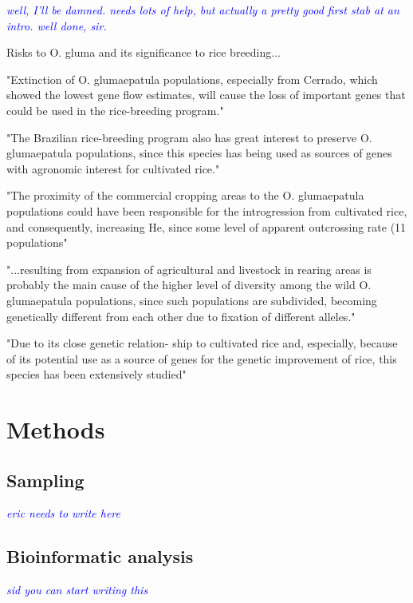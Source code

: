 \documentclass[11pt]{article} %
\newcommand{\jri}[1]{\textcolor{blue}{ \emph{\scriptsize  #1}} } %
\begin{document}
\begin{linenumbers}
\jri{well, I'll be damned. needs lots of help, but actually a pretty good first stab at an intro. well done, sir.}


Risks to O. gluma and its significance to rice breeding...

"Extinction of O. glumaepatula populations, especially from Cerrado,
which showed the lowest gene flow estimates, will cause the loss of 
important genes that could be used in the rice-breeding program."
\cite{brondani2005}

"The Brazilian rice-breeding
program also has great interest to preserve
O. glumaepatula populations, since this species has
being used as sources of genes with agronomic
interest for cultivated rice."
\cite{brondani2005}

"The proximity of the
commercial cropping areas to the O. glumaepatula
populations could have been responsible for the
introgression from cultivated rice, and consequently,
increasing He, since some level of apparent
outcrossing rate (11%
populations"
\cite{brondani2005}

"...resulting from expansion of agricultural
and livestock in rearing areas is probably the
main cause of the higher level of diversity among
the wild O. glumaepatula populations, since such
populations are subdivided, becoming genetically
different from each other due to fixation of different
alleles."
\cite{brondani2005}

"Due to its close genetic relation-
ship to cultivated rice and, especially, because of its
potential use as a source of genes for the genetic
improvement of rice, this species has been extensively
studied" 
\cite{SánchezandEspinoza2003}

\section*{Methods}
\subsection*{Sampling}
\jri{eric needs to write here}
\subsection*{Bioinformatic analysis}
\jri{sid you can start writing this}

\clearpage



\end{linenumbers}
\end{document}

